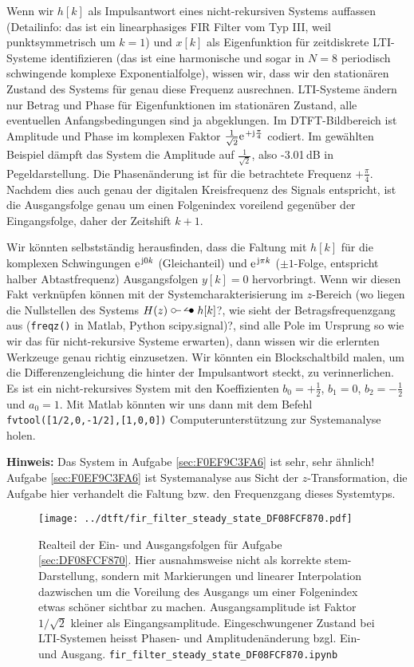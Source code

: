 \begin{Loesung}
Wenn wir $h[k]$ als Impulsantwort eines nicht-rekursiven Systems auffassen
(Detailinfo: das ist ein linearphasiges FIR Filter vom Typ III, weil punktsymmetrisch um $k=1$)
und $x[k]$ als Eigenfunktion für zeitdiskrete LTI-Systeme identifizieren
(das ist eine harmonische und sogar in $N=8$ periodisch schwingende komplexe
Exponentialfolge), wissen wir, dass wir den stationären Zustand des Systems
für genau diese Frequenz ausrechnen.
%
LTI-Systeme ändern nur Betrag und Phase für Eigenfunktionen im stationären Zustand,
alle eventuellen Anfangsbedingungen sind ja abgeklungen.
%
Im DTFT-Bildbereich ist Amplitude und Phase im komplexen Faktor
$\frac{1}{\sqrt{2}} \e^{+\im\frac{\pi}{4}}$
codiert.
%
Im gewählten Beispiel dämpft das System die Amplitude auf $\frac{1}{\sqrt{2}}$,
also -3.01\,dB in Pegeldarstellung.
%
Die Phasenänderung ist für die betrachtete Frequenz $+\frac{\pi}{4}$.
Nachdem dies auch genau der digitalen Kreisfrequenz des Signals entspricht,
ist die Ausgangsfolge
genau um einen Folgenindex voreilend gegenüber der Eingangsfolge, daher der
Zeitshift $k+1$.
%

Wir könnten selbstständig herausfinden, dass die Faltung mit $h[k]$ für die komplexen
Schwingungen $\e^{\im 0 k}$ (Gleichanteil) und $\e^{\im \pi k}$ ($\pm 1$-Folge,
entspricht halber Abtastfrequenz) Ausgangsfolgen $y[k]=0$ hervorbringt.
%
Wenn wir diesen Fakt verknüpfen können mit der Systemcharakterisierung
im $z$-Bereich (wo liegen die Nullstellen des Systems $H(z) \ztransf h[k]$?,
wie sieht der Betragsfrequenzgang aus (\texttt{freqz()} in Matlab, Python scipy.signal)?,
sind alle Pole im Ursprung so wie wir das
für nicht-rekursive Systeme erwarten),
dann wissen wir die erlernten Werkzeuge genau richtig einzusetzen.
%
Wir könnten ein Blockschaltbild malen, um die Differenzengleichung die hinter
der Impulsantwort steckt, zu verinnerlichen.
%
Es ist ein nicht-rekursives System mit den Koeffizienten $b_0=+\frac{1}{2}$, $b_1=0$,
$b_2=-\frac{1}{2}$ und $a_0=1$.
%
Mit Matlab könnten wir uns dann mit dem Befehl \texttt{fvtool([1/2,0,-1/2],[1,0,0])}
Computerunterstützung zur Systemanalyse holen.
%

\textbf{Hinweis:} Das System in Aufgabe \ref{sec:F0EF9C3FA6} ist sehr, sehr ähnlich!
Aufgabe \ref{sec:F0EF9C3FA6} ist Systemanalyse aus Sicht der $z$-Transformation,
die Aufgabe hier verhandelt die Faltung bzw. den Frequenzgang dieses Systemtyps.
\end{Loesung}

\begin{figure}
\centering
\texttt{[image: ../dtft/fir\_filter\_steady\_state\_DF08FCF870.pdf]}
\caption{Realteil der Ein- und Ausgangsfolgen für Aufgabe \ref{sec:DF08FCF870}.
Hier ausnahmsweise nicht als korrekte stem-Darstellung, sondern mit Markierungen und
linearer Interpolation dazwischen
um die Voreilung des Ausgangs
um einer Folgenindex etwas schöner sichtbar zu machen. Ausgangsamplitude ist Faktor
$1/\sqrt{2}$ kleiner als Eingangsamplitude.
Eingeschwungener Zustand bei LTI-Systemen heisst Phasen- und Amplitudenänderung
bzgl. Ein- und Ausgang.
\texttt{fir\_filter\_steady\_state\_DF08FCF870.ipynb}}
\label{fig:DF08FCF870}
\end{figure}



